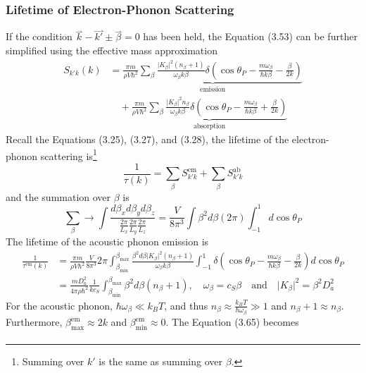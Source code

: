 \subsubsection{Lifetime of Electron-Phonon Scattering}
If the condition $\overset{\rightharpoonup}{k}-\overset{\rightharpoonup}{k'}\pm\overset{\rightharpoonup}{\beta}=0$ has been held, the Equation (3.53) can be further simplified using the effective mass approximation \begin{align}
    S_{k'k}(k)& = \underbrace{\frac{\pi m}{\rho V\hbar^{2}}\sum_{\beta}{\frac{\big|K_{\beta}\big|^{2}(n_{\beta}+1)}{ \omega_{\beta}k\beta}\delta\left(\cos{\theta_{P}}-\frac{m\omega_{\beta}}{\hbar k\beta}-\frac{\beta}{2k}\right)}}_{\text{emission}}\nonumber\\
    &\quad +\underbrace{\frac{\pi m}{\rho V\hbar^{2}}\sum_{\beta}{\frac{\big|K_{\beta}\big|^{2}n_{\beta}}{ \omega_{\beta}k\beta}\delta\left(\cos{\theta_{P}}-\frac{m\omega_{\beta}}{\hbar k\beta}+\frac{\beta}{2k}\right)}}_{\text{absorption}}
\end{align} Recall the Equations (3.25), (3.27), and (3.28), the lifetime of the electron-phonon scattering is\footnote{Summing over $k'$ is the same as summing over $\beta$.} \begin{equation}
    \frac{1}{\tau(k)} = \sum_{\beta}{S_{k'k}^{\text{em}}}+\sum_{\beta}{S_{k'k}^{\text{ab}}}
\end{equation} and the summation over $\beta$ is \begin{equation}
    \sum_{\beta} \rightarrow \int\frac{d\beta_{x}d\beta_{y}d\beta_{z}}{\frac{2\pi}{L_{x}}\frac{2\pi}{L_{y}}\frac{2\pi}{L_{z}}} = \frac{V}{8\pi^{3}}\int\beta^{2}d\beta(2\pi)\int_{-1}^{1}d\cos{\theta_{P}}
\end{equation} The lifetime of the acoustic phonon emission is \begin{align}
    \frac{1}{\tau^{\text{em}}(k)}& = \frac{\pi m}{\rho V\hbar^{2}}\frac{V}{8\pi^{3}}2\pi\int_{\beta_{\text{min}}}^{\beta_{\text{max}}}\frac{\beta^{2}d\beta\big|K_{\beta}\big|^{2}(n_{\beta}+1)}{\omega_{\beta}k\beta}\int_{-1}^{1}\delta\left(\cos{\theta_{P}}-\frac{m\omega_{\beta}}{\hbar k\beta}-\frac{\beta}{2k}\right)d\cos{\theta_{P}}\nonumber\\
    & = \frac{mD_{a}^{2}}{4\pi\rho\hbar^{2}}\frac{1}{kc_{S}}\int_{\beta_{\text{min}}}^{\beta_{\text{max}}}\beta^{2}d\beta(n_{\beta}+1),\quad \omega_{\beta}=c_{S}\beta\quad\text{and}\quad\big|K_{\beta}\big|^{2}=\beta^{2}D_{a}^{2}
\end{align} For the acoustic phonon, $\hbar\omega_{\beta}\ll k_{B}T$, and thus $n_{\beta}\approx\frac{k_{B}T}{\hbar\omega_{\beta}}\gg 1$ and $n_{\beta}+1\approx n_{\beta}$. Furthermore, $\beta_{\text{max}}^{\text{em}}\approx 2k$ and $\beta_{\text{min}}^{\text{em}}\approx 0$. The Equation (3.65) becomes \begin{align}

\end{align}
